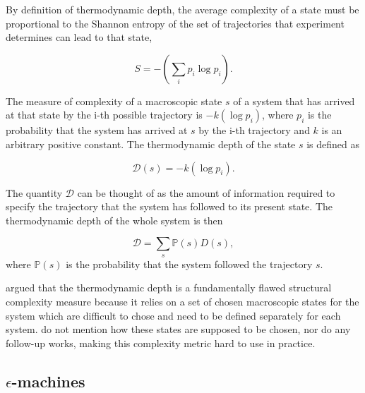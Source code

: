 By definition of thermodynamic depth, the average complexity of a state must be
proportional to the Shannon entropy
\parencite{shannonMathematicalTheoryCommunication1975} of the set of
trajectories that experiment determines can lead to that state,

\begin{equation}
  \label{eq:3}
  S = -\left(\sum_{i} p_{i} \log p_{i}\right).
\end{equation}

The measure of complexity of a macroscopic state $s$ of a system that has
arrived at that state by the i-th possible trajectory is $-k(\log p_{i})$, where
$p_{i}$ is the probability that the system has arrived at $s$ by the i-th
trajectory and $k$ is an arbitrary positive constant. The thermodynamic depth of
the state $s$ is defined as

\begin{equation}
  \label{eq:4}
  \mathcal{D}(s) = -k(\log p_{i}).
\end{equation}

The quantity $\mathcal{D}$ can be thought of as the amount of information
required to specify the trajectory that the system has followed to its present
state. The thermodynamic depth of the whole system is then

\begin{equation}
  \label{eq:5}
  \mathcal{D} = \sum_{s}\mathbb{P}(s)D(s),
\end{equation}
where $\mathbb{P}(s)$ is the probability that the system followed the
trajectory $s$.

\textcite{crutchfieldThermodynamicDepthCausal1999} argued that the thermodynamic
depth is a fundamentally flawed structural complexity measure because it relies
on a set of chosen macroscopic states for the system which are difficult to
chose and need to be defined separately for each system.
\textcite{lloydComplexityThermodynamicDepth1988} do not mention how these states
are supposed to be chosen, nor do any follow-up works, making this complexity
metric hard to use in practice.

\subsection{$\epsilon$-machines}

